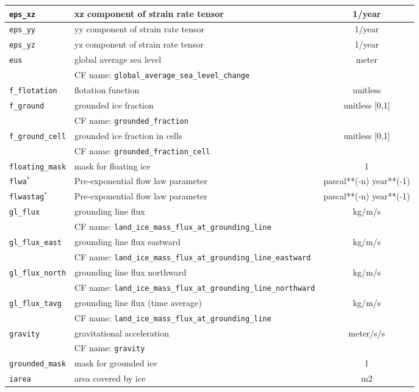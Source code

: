\begin{center}
\begin{supertabular}{|l|p{8cm}|c|}
\hline
\texttt{eps\_xz} & xz component of strain rate tensor & 1/year\\
\hline
\texttt{eps\_yy} & yy component of strain rate tensor & 1/year\\
\hline
\texttt{eps\_yz} & yz component of strain rate tensor & 1/year\\
\hline
\texttt{eus} & global average sea level & meter\\
&CF name: \texttt{global\_average\_sea\_level\_change}&\\
\hline
\texttt{f\_flotation} & flotation function & unitless\\
\hline
\texttt{f\_ground} & grounded ice fraction & unitless [0,1]\\
&CF name: \texttt{grounded\_fraction}&\\
\hline
\texttt{f\_ground\_cell} & grounded ice fraction in cells & unitless [0,1]\\
&CF name: \texttt{grounded\_fraction\_cell}&\\
\hline
\texttt{floating\_mask} & mask for floating ice & 1\\
\hline
\texttt{flwa}$^\ast$ & Pre-exponential flow law parameter & pascal**(-n) year**(-1)\\
\hline
\texttt{flwastag}$^\ast$ & Pre-exponential flow law parameter & pascal**(-n) year**(-1)\\
\hline
\texttt{gl\_flux} & grounding line flux & kg/m/s\\
&CF name: \texttt{land\_ice\_mass\_flux\_at\_grounding\_line}&\\
\hline
\texttt{gl\_flux\_east} & grounding line flux eastward & kg/m/s\\
&CF name: \texttt{land\_ice\_mass\_flux\_at\_grounding\_line\_eastward}&\\
\hline
\texttt{gl\_flux\_north} & grounding line flux northward & kg/m/s\\
&CF name: \texttt{land\_ice\_mass\_flux\_at\_grounding\_line\_northward}&\\
\hline
\texttt{gl\_flux\_tavg} & grounding line flux (time average) & kg/m/s\\
&CF name: \texttt{land\_ice\_mass\_flux\_at\_grounding\_line}&\\
\hline
\texttt{gravity} & gravitational acceleration & meter/s/s\\
&CF name: \texttt{gravity}&\\
\hline
\texttt{grounded\_mask} & mask for grounded ice & 1\\
\hline
\texttt{iarea} & area covered by ice & m2\\

\end{supertabular}
\end{center}
